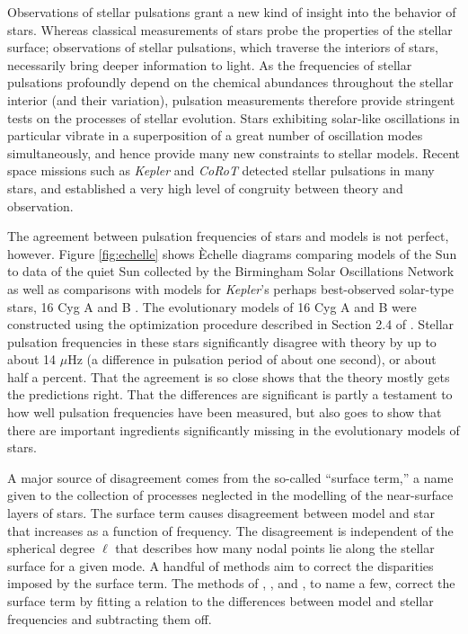 \documentclass[twocolumn,twocolappendix]{aastex6}
\begin{document}
Observations of stellar pulsations grant a new kind of insight into the behavior of stars. Whereas classical measurements of stars probe the properties of the stellar surface; observations of stellar pulsations, which traverse the interiors of stars, necessarily bring deeper information to light. As the frequencies of stellar pulsations profoundly depend on the chemical abundances throughout the stellar interior (and their variation), pulsation measurements therefore provide stringent tests on the processes of stellar evolution. 
Stars exhibiting solar-like oscillations in particular vibrate in a superposition of a great number of oscillation modes simultaneously, and hence provide many new constraints to stellar models. 
Recent space missions such as \emph{Kepler} and \emph{CoRoT} detected stellar pulsations in many stars, and established a very high level of congruity between theory and observation. 


The agreement between pulsation frequencies of stars and models is not perfect, however. Figure \ref{fig:echelle} shows \`Echelle diagrams comparing models of the Sun to data of the quiet Sun collected by the Birmingham Solar Oscillations Network \citep[BiSON,][]{2014MNRAS.439.2025D} as well as comparisons with models for \emph{Kepler}'s perhaps best-observed solar-type stars, 16 Cyg A and B \citep{2015MNRAS.446.2959D}. 
The evolutionary models of 16 Cyg A and B were constructed using the optimization procedure described in Section 2.4 of \citet{2017A&A...600A.128B}. %
Stellar pulsation frequencies in these stars significantly disagree with theory by up to about 14 $\mu\text{Hz}$ (a difference in pulsation period of about one second), or about half a percent. That the agreement is so close shows that the theory mostly gets the predictions right. That the differences are significant is partly a testament to how well pulsation frequencies have been measured, but also goes to show that there are important ingredients significantly missing in the evolutionary models of stars. 


A major source of disagreement comes from the so-called ``surface term,'' a name given to the collection of processes neglected in the modelling of the near-surface layers of stars. 
The surface term causes disagreement between model and star that increases as a function of frequency. The disagreement is independent of the spherical degree $\ell$ that describes how many nodal points lie along the stellar surface for a given mode. 
A handful of methods aim to correct the disparities imposed by the surface term. The methods of \citet{2008ApJ...683L.175K}, \citet{2014A&A...568A.123B}, and \citet{2015A&A...583A.112S}, to name a few, correct the surface term by fitting a relation to the differences between model and stellar frequencies and subtracting them off. %
\end{document}
